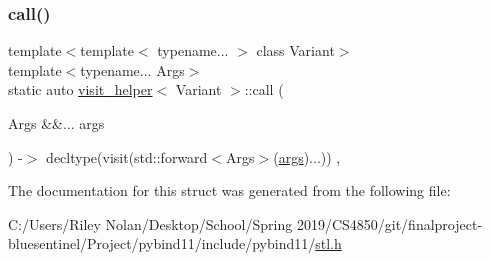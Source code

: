 \subsubsection{\texorpdfstring{call()}{call()}}
{\footnotesize\ttfamily template$<$template$<$ typename... $>$ class Variant$>$ \\
template$<$typename... Args$>$ \\
static auto \mbox{\hyperlink{structvisit__helper}{visit\+\_\+helper}}$<$ Variant $>$\+::call (\begin{DoxyParamCaption}\item[{Args \&\&...}]{args }\end{DoxyParamCaption}) -\/$>$ decltype(visit(std\+::forward$<$Args$>$(\mbox{\hyperlink{classargs}{args}})...)) \hspace{0.3cm}{\ttfamily [inline]}, {\ttfamily [static]}}



The documentation for this struct was generated from the following file\+:\begin{DoxyCompactItemize}
\item 
C\+:/\+Users/\+Riley Nolan/\+Desktop/\+School/\+Spring 2019/\+C\+S4850/git/finalproject-\/bluesentinel/\+Project/pybind11/include/pybind11/\mbox{\hyperlink{stl_8h}{stl.\+h}}\end{DoxyCompactItemize}

